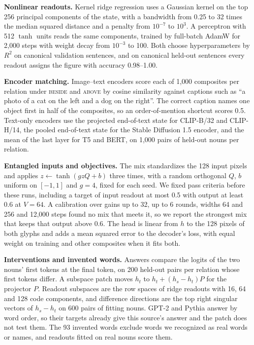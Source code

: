 \documentclass[10pt]{article}
\theoremstyle{plain}
\theoremstyle{remark}
\begin{document}
\textbf{Nonlinear readouts.}\label{app:e19} Kernel ridge regression uses a Gaussian kernel on the top 256 principal components of the state, with a bandwidth from 0.25 to 32 times the median squared distance and a penalty from $10^{-7}$ to $10^{3}$. A perceptron with 512 $\tanh$ units reads the same components, trained by full-batch AdamW for 2{,}000 steps with weight decay from $10^{-3}$ to 100. Both choose hyperparameters by $R^2$ on canonical validation sentences, and on canonical held-out sentences every readout assigns the figure with accuracy 0.98--1.00.

\textbf{Encoder matching.} Image--text encoders score each of 1{,}000 composites per relation under \textsc{beside} and \textsc{above} by cosine similarity against captions such as ``a photo of a cat on the left and a dog on the right''. The correct caption names one object first in half of the composites, so an order-of-mention shortcut scores 0.5. Text-only encoders use the projected end-of-text state for CLIP-B/32 and CLIP-H/14, the pooled end-of-text state for the Stable Diffusion 1.5 encoder, and the mean of the last layer for T5 and BERT, on 1{,}000 pairs of held-out nouns per relation.

\textbf{Entangled inputs and objectives.} The mix standardizes the 128 input pixels and applies $z \leftarrow \tanh(g z Q + b)$ three times, with a random orthogonal $Q$, $b$ uniform on $[-1, 1]$ and $g = 4$, fixed for each seed. We fixed pass criteria before these runs, including a target of input readout at most 0.5 with output at least 0.6 at $V = 64$. A calibration over gains up to 32, up to 6 rounds, widths 64 and 256 and 12{,}000 steps found no mix that meets it, so we report the strongest mix that keeps that output above 0.6. The head is linear from $h$ to the 128 pixels of both glyphs and adds a mean squared error to the decoder's loss, with equal weight on training and other composites when it fits both.

\textbf{Interventions and invented words.} Answers compare the logits of the two nouns' first tokens at the final token, on 200 held-out pairs per relation whose first tokens differ. A subspace patch moves $h_t$ to $h_t + (h_s - h_t) P$ for the projector $P$. Readout subspaces are the row spaces of ridge readouts with 16, 64 and 128 code components, and difference directions are the top right singular vectors of $h_s - h_t$ on 600 pairs of fitting nouns. GPT-2 and Pythia answer by word order, so their targets already give this source's answer and the patch does not test them. The 93 invented words exclude words we recognized as real words or names, and readouts fitted on real nouns score them.
\end{document}
